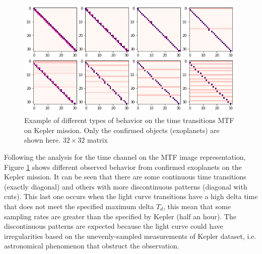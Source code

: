 \begin{figure}[t!]
\includegraphics[width=.9\linewidth]{imgs/MTF_Time.png}
\caption{Example of different types of behavior on the time transitions MTF on Kepler mission. Only the confirmed objects (exoplanets) are shown here. $32\times 32$ matrix}
\label{ex:mtf_time}
\end{figure}
Following the analysis for the time channel on the MTF image representation, Figure \ref{ex:mtf_time} shows different observed behavior from confirmed exoplanets on the Kepler mission.
It can be seen that there are some continuous time transitions (exactly diagonal) and others with more discontinuous patterns (diagonal with cuts).
This last one occurs when the light curve transitions have a high delta time that does not meet the specified maximum delta $T_d$, this mean that some sampling rates are greater than the specified by Kepler (half an hour).
The discontinuous patterns are expected because the light curve could have irregularities based on the unevenly-sampled measurements of Kepler dataset, i.e. astronomical phenomenon that obstruct the observation.


